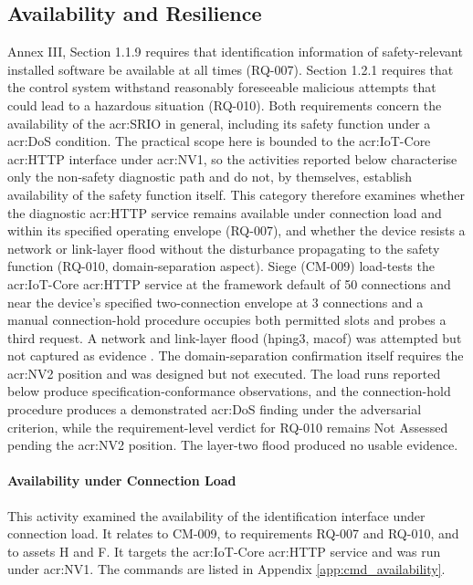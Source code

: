 \subsection{Availability and Resilience}
\label{subsec:cat_availability} 
Annex III, Section 1.1.9 requires that identification information of safety-relevant installed software be available at all times (RQ-007). Section 1.2.1 requires that the control system withstand reasonably foreseeable malicious attempts that could lead to a hazardous situation (RQ-010). Both requirements concern the availability of the \gls{acr:SRIO} in general, including its safety function under a \gls{acr:DoS} condition. The practical scope here is bounded to the \gls{acr:IoT}-Core \gls{acr:HTTP} interface under \gls{acr:NV1}, so the activities reported below characterise only the non-safety diagnostic path and do not, by themselves, establish availability of the safety function itself.
This category therefore examines whether the diagnostic \gls{acr:HTTP} service remains available under connection load and within its specified operating envelope (RQ-007), and whether the device resists a network or link-layer flood without the disturbance propagating to the safety function (RQ-010, domain-separation aspect). Siege (CM-009) load-tests the \gls{acr:IoT}-Core \gls{acr:HTTP} service at the framework default of 50 connections and near the device's specified two-connection envelope at 3 connections and a manual connection-hold procedure occupies both permitted slots and probes a third request. A network and link-layer flood (hping3, macof) was attempted but not captured as evidence \cite{macof_man} \cite{kali_hping3}. The domain-separation confirmation itself requires the \gls{acr:NV2} position and was designed but not executed. The load runs reported below produce specification-conformance observations, and the connection-hold procedure produces a demonstrated \gls{acr:DoS} finding under the adversarial criterion, while the requirement-level verdict for RQ-010 remains Not Assessed pending the \gls{acr:NV2} position. The layer-two flood produced no usable evidence.

\paragraph{Availability under Connection Load}
\label{subsec:res_availability}
This activity examined the availability of the identification interface under connection load. It relates to CM-009, to requirements RQ-007 and RQ-010, and to assets H and F. It targets the \gls{acr:IoT}-Core \gls{acr:HTTP} service and was run under \gls{acr:NV1}. The commands are listed in Appendix \ref{app:cmd_availability}.

